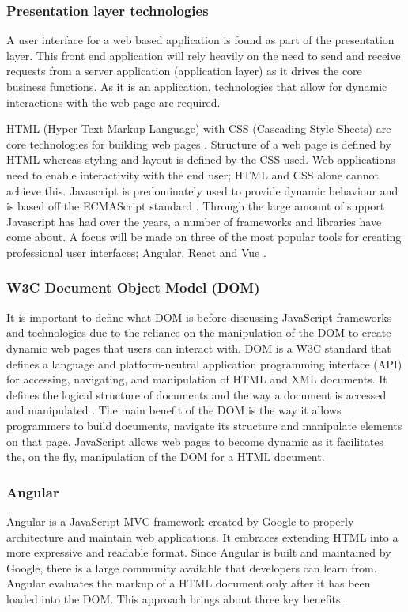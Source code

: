 \subsubsection{Presentation layer technologies}
A user interface for a web based application is found as part of the presentation layer.
This front end application will rely heavily on the need to send and receive requests from a server application (application layer) as 
it drives the core business functions.
As it is an application, technologies that allow for dynamic interactions with the web page are required.

HTML (Hyper Text Markup Language) with CSS (Cascading Style Sheets) are core technologies for building web pages \cite{w3c_html_css}.
Structure of a web page is defined by HTML whereas styling and layout is defined by the CSS used.
Web applications need to enable interactivity with the end user; HTML and CSS alone cannot achieve this.
Javascript is predominately used to provide dynamic behaviour and is based off the ECMAScript standard \cite{stefanov2010javascript}.
Through the large amount of support Javascript has had over the years, a number of frameworks and libraries have come about.
A focus will be made on three of the most popular tools for creating professional user interfaces; Angular, React and Vue \cite{stateofjs_2018}.

\subsubsection*{W3C Document Object Model (DOM)}
It is important to define what DOM is before discussing JavaScript frameworks and technologies due to the reliance on the manipulation of the DOM to 
create dynamic web pages that users can interact with.
DOM is a W3C standard that defines a language and platform-neutral application programming interface (API) for accessing, navigating, and 
manipulation of HTML and XML documents.
It defines the logical structure of documents and the way a document is accessed and manipulated \cite{wood1999programming}.
The main benefit of the DOM is the way it allows programmers to build documents, navigate its structure and manipulate elements on that page.
JavaScript allows web pages to become dynamic as it facilitates the, on the fly, manipulation of the DOM for a HTML document.

\subsubsection*{Angular}
Angular is a JavaScript MVC framework created by Google to properly architecture and maintain web applications.
It embraces extending HTML into a more expressive and readable format. 
Since Angular is built and maintained by Google, there is a large community available that developers can learn from.
Angular evaluates the markup of a HTML document only after it has been loaded into the DOM.
This approach brings about three key benefits.

